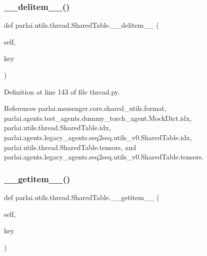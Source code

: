 \mbox{\label{classparlai_1_1utils_1_1thread_1_1SharedTable_a567947ad20bdc1ad18815fc1883ea247}} 
\subsubsection{\texorpdfstring{\+\_\+\+\_\+delitem\+\_\+\+\_\+()}{\_\_delitem\_\_()}}
{\footnotesize\ttfamily def parlai.\+utils.\+thread.\+Shared\+Table.\+\_\+\+\_\+delitem\+\_\+\+\_\+ (\begin{DoxyParamCaption}\item[{}]{self,  }\item[{}]{key }\end{DoxyParamCaption})}



Definition at line 143 of file thread.\+py.



References parlai.\+messenger.\+core.\+shared\+\_\+utils.\+format, parlai.\+agents.\+test\+\_\+agents.\+dummy\+\_\+torch\+\_\+agent.\+Mock\+Dict.\+idx, parlai.\+utils.\+thread.\+Shared\+Table.\+idx, parlai.\+agents.\+legacy\+\_\+agents.\+seq2seq.\+utils\+\_\+v0.\+Shared\+Table.\+idx, parlai.\+utils.\+thread.\+Shared\+Table.\+tensors, and parlai.\+agents.\+legacy\+\_\+agents.\+seq2seq.\+utils\+\_\+v0.\+Shared\+Table.\+tensors.

\mbox{\label{classparlai_1_1utils_1_1thread_1_1SharedTable_a624b898ff3294a8be69ad796640cc7ee}} 
\subsubsection{\texorpdfstring{\+\_\+\+\_\+getitem\+\_\+\+\_\+()}{\_\_getitem\_\_()}}
{\footnotesize\ttfamily def parlai.\+utils.\+thread.\+Shared\+Table.\+\_\+\+\_\+getitem\+\_\+\+\_\+ (\begin{DoxyParamCaption}\item[{}]{self,  }\item[{}]{key }\end{DoxyParamCaption})}


